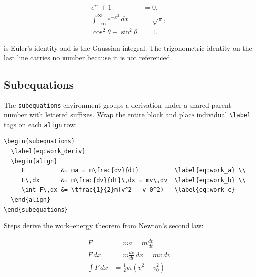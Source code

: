 \begin{align}
    \label{eq:euler}
    e^{i\pi} + 1 &= 0, \\
    \label{eq:gaussian}
    \int_{-\infty}^{\infty} e^{-x^2}\,dx &= \sqrt{\pi}, \\
    \cos^2\theta + \sin^2\theta &= 1. \nonumber
\end{align}

 is Euler's identity and  is the
Gaussian integral. The trigonometric identity on the last line
carries no number because it is not referenced.

\lipsum[1]

\subsection{Subequations}

The \texttt{subequations} environment groups a derivation under a
shared parent number with lettered suffixes. Wrap the entire block
and place individual \verb|\label| tags on each \texttt{align} row:

\begin{verbatim}
\begin{subequations}
  \label{eq:work_deriv}
  \begin{align}
     F          &= ma = m\frac{dv}{dt}          \label{eq:work_a} \\
     F\,dx      &= m\frac{dv}{dt}\,dx = mv\,dv  \label{eq:work_b} \\
     \int F\,dx &= \tfrac{1}{2}m(v^2 - v_0^2)   \label{eq:work_c}
  \end{align}
\end{subequations}
\end{verbatim}

Steps  derive the work--energy theorem
from Newton's second law:

\begin{subequations}
    \label{eq:work_deriv}
    \begin{align}
     F          &= ma = m\frac{dv}{dt}          \label{eq:work_a} \\
     F\,dx      &= m\frac{dv}{dt}\,dx = mv\,dv  \label{eq:work_b} \\
     \int F\,dx &= \tfrac{1}{2}m(v^2 - v_0^2)   \label{eq:work_c}
    \end{align}
\end{subequations}

